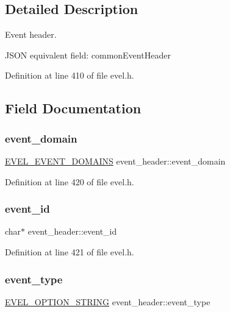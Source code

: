 \subsection{Detailed Description}
Event header. 

J\+S\+ON equivalent field\+: common\+Event\+Header 

Definition at line 410 of file evel.\+h.



\subsection{Field Documentation}
\hypertarget{structevent__header_a191eca173d8bd260c598a2b79a026ab1}{}\label{structevent__header_a191eca173d8bd260c598a2b79a026ab1} 
\subsubsection{\texorpdfstring{event\+\_\+domain}{event\_domain}}
{\footnotesize\ttfamily \hyperlink{evel_8h_ac34d44f4f90f2b63828a32ca9c7b0855}{E\+V\+E\+L\+\_\+\+E\+V\+E\+N\+T\+\_\+\+D\+O\+M\+A\+I\+NS} event\+\_\+header\+::event\+\_\+domain}



Definition at line 420 of file evel.\+h.

\hypertarget{structevent__header_a8123ea69f23cf078fc39304d6eeb6c26}{}\label{structevent__header_a8123ea69f23cf078fc39304d6eeb6c26} 
\subsubsection{\texorpdfstring{event\+\_\+id}{event\_id}}
{\footnotesize\ttfamily char$\ast$ event\+\_\+header\+::event\+\_\+id}



Definition at line 421 of file evel.\+h.

\hypertarget{structevent__header_a2ae85cc7be8606552cfeb4ced0a98c80}{}\label{structevent__header_a2ae85cc7be8606552cfeb4ced0a98c80} 
\subsubsection{\texorpdfstring{event\+\_\+type}{event\_type}}
{\footnotesize\ttfamily \hyperlink{evel_8h_a0de5113a7b72de93c0c7b644f7ea7ec3}{E\+V\+E\+L\+\_\+\+O\+P\+T\+I\+O\+N\+\_\+\+S\+T\+R\+I\+NG} event\+\_\+header\+::event\+\_\+type}



